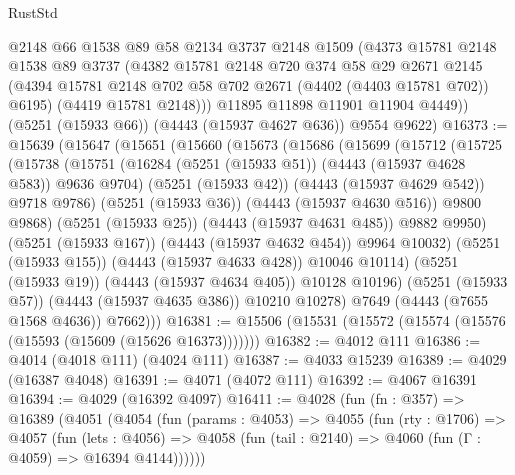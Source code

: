 \begin{lexlean}{RustStd}
\begin{coremodule}
          @2148
          @66
          @1538
          @89
          @58
          @2134
          @3737
          @2148
          @1509
          (@4373
            @15781
            @2148
            @1538
            @89
            @3737
            (@4382
              @15781
              @2148
              @720
              @374
              @58
              @29
              @2671
              @2145
              (@4394 @15781 @2148 @702 @58 @702 @2671 (@4402 (@4403 @15781 @702)) @6195)
              (@4419 @15781 @2148)))
          @11895
          @11898
          @11901
          @11904
          @4449))
      (@5251 (@15933 @66))
      (@4443 (@15937 @4627 @636))
      @9554
      @9622)
@16373 := @15639
    (@15647
      (@15651
        (@15660
          (@15673
            (@15686
              (@15699
                (@15712
                  (@15725
                    (@15738
                      (@15751
                        (@16284 (@5251 (@15933 @51)) (@4443 (@15937 @4628 @583)) @9636 @9704)
                        (@5251 (@15933 @42))
                        (@4443 (@15937 @4629 @542))
                        @9718
                        @9786)
                      (@5251 (@15933 @36))
                      (@4443 (@15937 @4630 @516))
                      @9800
                      @9868)
                    (@5251 (@15933 @25))
                    (@4443 (@15937 @4631 @485))
                    @9882
                    @9950)
                  (@5251 (@15933 @167))
                  (@4443 (@15937 @4632 @454))
                  @9964
                  @10032)
                (@5251 (@15933 @155))
                (@4443 (@15937 @4633 @428))
                @10046
                @10114)
              (@5251 (@15933 @19))
              (@4443 (@15937 @4634 @405))
              @10128
              @10196)
            (@5251 (@15933 @57))
            (@4443 (@15937 @4635 @386))
            @10210
            @10278)
          @7649
          (@4443 (@7655 @1568 @4636))
          @7662)))
@16381 := @15506 (@15531 (@15572 (@15574 (@15576 (@15593 (@15609 (@15626 @16373)))))))
@16382 := @4012 @111
@16386 := @4014 (@4018 @111) (@4024 @111)
@16387 := @4033 @15239
@16389 := @4029 (@16387 @4048)
@16391 := @4071 (@4072 @111)
@16392 := @4067 @16391
@16394 := @4029 (@16392 @4097)
@16411 := @4028
    (fun (fn : @357) =>
    @16389
      (@4051
        (@4054
          (fun (params : @4053) =>
          @4055
            (fun (rty : @1706) =>
            @4057
              (fun (lets : @4056) =>
              @4058 (fun (tail : @2140) => @4060 (fun (Γ : @4059) => @16394 @4144))))))

\end{coremodule}
\end{lexlean}
